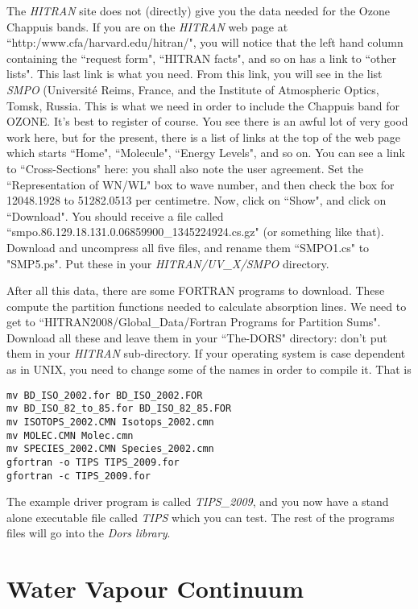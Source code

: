 \documentclass[12pt]{article}
\begin{document}
The {\it HITRAN} site does not
 (directly) give you the data needed for the Ozone Chappuis
bands. If you are on the {\it HITRAN} web page at
 ``http:/www.cfa/harvard.edu/hitran/", you will notice that
the left hand column containing the ``request form", ``HITRAN facts", and so on has a link to ``other lists". This last link is what you need. From this link, you will see in the list {\it SMPO}
 (Universit\'{e} Reims, France, and the Institute of Atmospheric Optics, Tomsk, Russia. This is what we need in order to include
the Chappuis band for OZONE. It's best to register of course.
You see there is an awful lot of very good work here, but for
the present, there is a list of links at the top of the web page
which starts ``Home", ``Molecule", ``Energy Levels", and so on.
You can see a link to ``Cross-Sections" here: you shall also note the user agreement. Set the ``Representation of WN/WL" box to
wave number, and then check the box for 12048.1928 to 51282.0513 per centimetre. Now, click on ``Show", and click on ``Download". You should
receive a file called ``smpo.86.129.18.131.0.06859900\_1345224924.cs.gz" 
(or something like that). Download and uncompress all five files, and rename them ``SMPO1.cs" to "SMP5.ps".
Put these in your {\it HITRAN/UV\_X/SMPO} directory.

After all this data, there are some FORTRAN programs to download. These compute the
partition functions needed to calculate absorption lines.
We need to get to ``HITRAN2008/Global\_Data/Fortran Programs for Partition Sums".
Download all these and leave them in your ``The-DORS" directory: don't put them in your {\it HITRAN}
sub-directory.
 If your operating 
system is case dependent as in UNIX, you need to change some of the names in order to compile it. That is
\begin{verbatim}
mv BD_ISO_2002.for BD_ISO_2002.FOR
mv BD_ISO_82_to_85.for BD_ISO_82_85.FOR
mv ISOTOPS_2002.CMN Isotops_2002.cmn
mv MOLEC.CMN Molec.cmn
mv SPECIES_2002.CMN Species_2002.cmn
gfortran -o TIPS TIPS_2009.for
gfortran -c TIPS_2009.for
\end{verbatim}
The example driver program is called {\it TIPS\_2009}, and you now have a stand alone executable file called {\it TIPS} which you can test. The rest of the 
programs files will go into the {\it Dors library}.

\section{Water Vapour Continuum}
\end{document}
